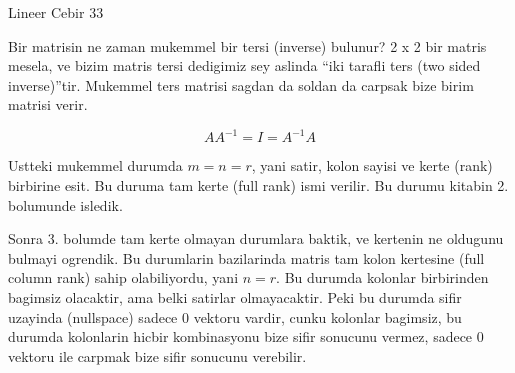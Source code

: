 \documentclass[12pt,fleqn]{article}\usepackage{../common}
\begin{document}
Lineer Cebir 33

Bir matrisin ne zaman mukemmel bir tersi (inverse) bulunur? 2 x 2 bir
matris mesela, ve bizim matris tersi dedigimiz sey aslinda ``iki tarafli
ters (two sided inverse)''tir. Mukemmel ters matrisi sagdan da soldan da
carpsak bize birim matrisi verir. 

$$ A A^{-1} = I = A^{-1}A $$

Ustteki mukemmel durumda $m = n = r$, yani satir, kolon sayisi ve kerte
(rank) birbirine esit. Bu duruma tam kerte (full rank) ismi verilir. Bu
durumu kitabin 2. bolumunde isledik. 

Sonra 3. bolumde tam kerte olmayan durumlara baktik, ve kertenin ne
oldugunu bulmayi ogrendik. Bu durumlarin bazilarinda matris tam kolon
kertesine (full column rank) sahip olabiliyordu, yani $n = r$. Bu durumda
kolonlar birbirinden bagimsiz olacaktir, ama belki satirlar
olmayacaktir. Peki bu durumda sifir uzayinda (nullspace) sadece 0 vektoru
vardir, cunku kolonlar bagimsiz, bu durumda kolonlarin hicbir kombinasyonu
bize sifir sonucunu vermez, sadece 0 vektoru ile carpmak bize sifir
sonucunu verebilir. 
\end{document}
